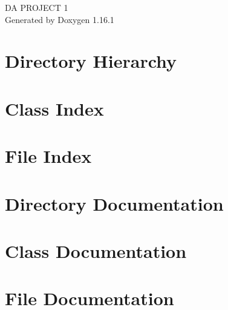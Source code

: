 \documentclass[twoside]{book}
\newcommand{\+}{\discretionary{\mbox{\scriptsize$\hookleftarrow$}}{}{}}
\newcommand{\clearemptydoublepage}{%
    \newpage{\pagestyle{empty}\cleardoublepage}%
  }
\begin{document}
  \raggedbottom
    \hypersetup{pageanchor=false,
                bookmarksnumbered=true,
                pdfencoding=unicode
               }
  \begin{titlepage}
  \vspace*{7cm}
  \begin{center}%
  {\Large DA PROJECT 1}\\
  \vspace*{1cm}
  {\large Generated by Doxygen 1.16.1}\\
  \end{center}
  \end{titlepage}
  \clearemptydoublepage
  \tableofcontents
  \clearemptydoublepage
  \hypersetup{pageanchor=true}
\chapter{Directory Hierarchy}

\chapter{Class Index}

\chapter{File Index}

\chapter{Directory Documentation}





\chapter{Class Documentation}










\chapter{File Documentation}



















  \backmatter
  \newpage
  \clearemptydoublepage
  \printindex
\end{document}
